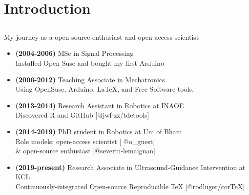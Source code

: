 \section{Introduction}

\subsection{}
{

\begin{frame}{My journey as a open-source enthusiast and open-access scientist}

\begin{itemize}	
	\item 
	\textbf{(2004-2006)} MSc in Signal Processing \\
	Installed Open Suse and bought my first Arduino
	\item \textbf{(2006-2012)} Teaching Associate in Mechatronics \\
	Using OpenSuse, Arduino, LaTeX, and Free Software tools.
	\item \textbf{(2013-2014)} 
	Research Assistant in Robotics at INAOE \\
	Discovered R and GitHub [\faGithub @jwf-zz/tdetools]
	\item \textbf{(2014-2019)} 
	PhD student in Robotics at Uni of Bham \\
		Role models: open-access scientist [ \faTwitter @o\_guest] \\
		\&
		open-source enthusiast [\faGithub @severin-lemaignan] 
	\item \textbf{(2019-present)} 
	Research Associate in Ultrasound-Guidance 
	Intervention at KCL \\
		Continuously-integrated Open-source Reproducible TeX [\faGithub @rodluger/corTeX]
\end{itemize}

	\vspace{-2mm}
	

	
\end{frame}
}



